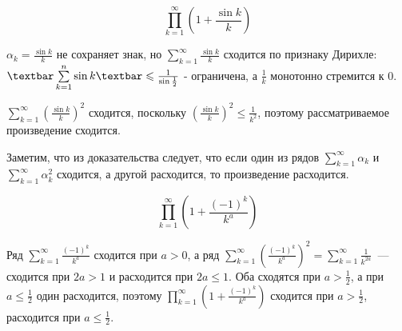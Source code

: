 \documentclass[../../main.tex]{subfiles}
\begin{document}
	\begin{example}
		\[\prod\limits_{k = 1}^{\infty} \left(1 + \frac{\sin k}{k}\right)\]
		
		$\alpha_k = \frac{\sin k}{k}$ не сохраняет знак, но $\sum\limits_{k = 
		1}^{\infty} \frac{\sin k}{k}$ сходится по признаку Дирихле: $\textbar 
		\sum\limits_{k = 1}^{n} \sin k \textbar \leq \frac{1}{\sin \frac{1}{2}}$ - 
		ограничена, а $\frac{1}{k}$ монотонно стремится к 0.
		
		$\sum\limits_{k = 1}^{\infty} \left(\frac{\sin k}{k}\right)^2$ сходится, 
		поскольку $\left(\frac{\sin k}{k}\right)^2 \leq \frac{1}{k^2}$, поэтому 
		рассматриваемое произведение сходится.
	\end{example}

	Заметим, что из доказательства следует, что если один из рядов 
	$\sum\limits_{k = 1}^{\infty} \alpha_k$ и $\sum\limits_{k = 1}^{\infty} 
	\alpha_k^2$ сходится, а другой расходится, то произведение расходится.
	
	\begin{example}
		\[\prod\limits_{k = 1}^{\infty} \left(1 + \frac{(-1)^k}{k^a}\right)\]
		
		Ряд $\sum\limits_{k = 1}^{\infty} \frac{(-1)^k}{k^a}$ сходится при $a > 0$, 
		а ряд $\sum\limits_{k = 1}^{\infty} \left(\frac{(-1)^k}{k^a}\right)^2 = 
		\sum\limits_{k = 1}^{\infty} \frac{1}{k^{2a}}$~--- сходится при $2a > 1$ и 
		расходится при $2a \leq 1$. Оба сходятся при $a > \frac{1}{2}$, а при $a 
		\leq \frac{1}{2}$ один расходится, поэтому $\prod\limits_{k = 1}^{\infty} 
		\left(1 + \frac{(-1)^k}{k^a}\right)$ сходится при $a > \frac{1}{2}$, 
		расходится при $a \leq \frac{1}{2}$.
	\end{example}
	
\end{document}
